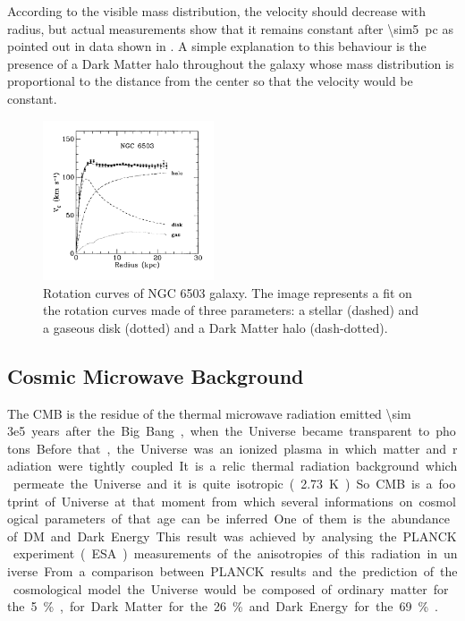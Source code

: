 According to the visible mass distribution, the velocity should decrease with radius, but actual measurements show that it remains constant after \SI{\sim5}{pc} as pointed out in data shown in \Fig{\ref{fig:rotation}}. A simple explanation to this behaviour is the presence of a Dark Matter halo throughout the galaxy whose mass distribution is proportional to the distance from the center so that the velocity would be constant.
\begin{figure}[pt]
\centering
\includegraphics[width=0.45\textwidth]{DarkMatter/Rotationcurves}
\caption{Rotation curves of NGC 6503 galaxy. The image represents a fit on the rotation curves made of three parameters: a stellar (dashed) and a gaseous disk (dotted) and a Dark Matter halo (dash-dotted).}
\label{fig:rotation}
\end{figure}


\subsection{Cosmic Microwave Background}
The CMB is the residue of the thermal microwave radiation emitted \SI{\sim 3e5} years after the Big Bang, when the Universe became transparent to photons. Before that, the Universe was an ionized plasma in which matter and radiation were tightly coupled. It is a relic thermal radiation background which permeate the Universe and it is quite isotropic (\SI{2.73}{\K}). So CMB is a footprint of Universe at that moment from which several informations on cosmological parameters of that age can be inferred. One of them is the abundance of DM and Dark Energy. This result was achieved by analysing the PLANCK experiment (ESA) measurements of the anisotropies of this radiation in universe. From a comparison between PLANCK results and the prediction of the cosmological model the Universe would be composed of ordinary matter for the 5\%, for Dark Matter for the 26\% and Dark Energy for the 69\% \cite{Planck:results}.

